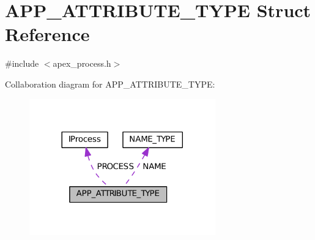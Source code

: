 \hypertarget{structAPP__ATTRIBUTE__TYPE}{}\section{A\+P\+P\+\_\+\+A\+T\+T\+R\+I\+B\+U\+T\+E\+\_\+\+T\+Y\+PE Struct Reference}
\label{structAPP__ATTRIBUTE__TYPE}


{\ttfamily \#include $<$apex\+\_\+process.\+h$>$}



Collaboration diagram for A\+P\+P\+\_\+\+A\+T\+T\+R\+I\+B\+U\+T\+E\+\_\+\+T\+Y\+PE\+:
\nopagebreak
\begin{figure}[H]
\begin{center}
\leavevmode
\includegraphics[width=228pt]{structAPP__ATTRIBUTE__TYPE__coll__graph}
\end{center}
\end{figure}
